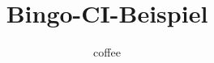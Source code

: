 \documentclass[a4paper, 11pt]{article}
\title{Bingo-CI-Beispiel}
\author{coffee}
\begin{document}
\maketitle
\lipsum
\end{document}
